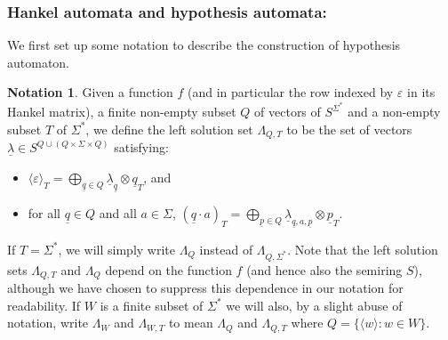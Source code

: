 \documentclass[10pt,a4paper]{amsart}
\theoremstyle{definition}
\numberwithin{equation}{section}
\newtheorem{nota}[thm]{Notation}
\numberwithin{theorem}{section}
\begin{document}
\subsubsection*{\textbf{Hankel automata and hypothesis automata:}}
We first set up some notation to describe the construction of hypothesis automaton.  
\begin{nota}
	\label{notation:lambda}
Given a function $f$ (and in particular the row indexed by $\varepsilon$ in its Hankel matrix), a finite non-empty subset $Q$ of vectors of $S^{\Sigma^*}$ and a non-empty subset $T$ of $\Sigma^*$, we define the left solution set $\Lambda_{Q, T}$  to be the set of vectors $\underline{\lambda} \in S^{Q \cup (Q \times \Sigma \times Q)}$ satisfying:
\begin{itemize}
\item $\langle \varepsilon \rangle_T = \bigoplus_{\underline{q} \in Q} \underline{\lambda}_{\underline{q}} \otimes \underline{q}_T$, and
\item for all $\underline{q} \in Q$ and all $a \in \Sigma$, $(\underline{q}\cdot a)_T= \bigoplus_{\underline{p} \in Q} \underline{\lambda}_{\underline{q},a,\underline{p}} \otimes \underline{p}_T$.
\end{itemize}
If $T=\Sigma^*$,  we will simply write $\Lambda_{Q}$ instead of $\Lambda_{Q, \Sigma^*}$.
Note that the left solution sets $\Lambda_{Q,T}$ and $\Lambda_Q$ depend on the function $f$ (and hence also the semiring $S$), although we have chosen to suppress this dependence in our notation for readability. 
If $W$ is a finite subset of $\Sigma^*$ we will also, by a slight abuse of notation, write $\Lambda_W$
and $\Lambda_{W,T}$
to mean $\Lambda_{Q}$ and $\Lambda_{Q,T}$ where 
$Q = \{\langle w \rangle: w \in W\}$.
\end{nota}
\end{document}
